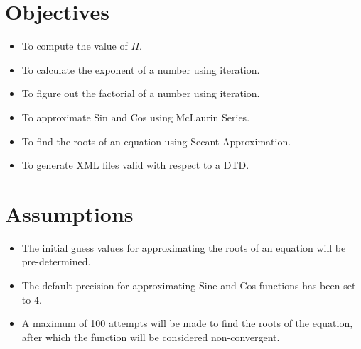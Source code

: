 \section{Objectives}
\begin{itemize}
  \item To compute the value of $\Pi$.
  \item To calculate the exponent of a number using iteration.
  \item To figure out the factorial of a number using iteration.
  \item To approximate Sin and Cos using McLaurin Series.
  \item To find the roots of an equation using Secant Approximation.
  \item To generate XML files valid with respect to a DTD.
\end{itemize}

\section{Assumptions}
\begin{itemize}
  \item The initial guess values for approximating the roots of an equation will be pre-determined.
  \item The default precision for approximating Sine and Cos functions has been set to 4.
  \item A maximum of 100 attempts will be made to find the roots of the equation, after which the function will be considered non-convergent.  
\end{itemize}
